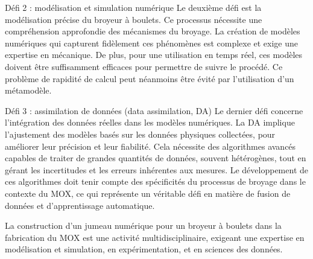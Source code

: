 Défi 2 : modélisation et simulation numérique
Le deuxième défi est la modélisation précise du broyeur à boulets. Ce processus nécessite une compréhension approfondie des mécanismes du broyage. La création de modèles numériques qui capturent fidèlement ces phénomènes est complexe et exige une expertise en mécanique. De plus, pour une utilisation en temps réel, ces modèles doivent être suffisamment efficaces pour permettre de suivre le procédé. Ce problème de rapidité de calcul peut néanmoins être évité par l'utilisation d'un métamodèle.

Défi 3 : assimilation de données (data assimilation, DA)
Le dernier défi concerne l'intégration des données réelles dans les modèles numériques. La DA implique l'ajustement des modèles basés sur les données physiques collectées, pour améliorer leur précision et leur fiabilité. Cela nécessite des algorithmes avancés capables de traiter de grandes quantités de données, souvent hétérogènes, tout en gérant les incertitudes et les erreurs inhérentes aux mesures. Le développement de ces algorithmes doit tenir compte des spécificités du processus de broyage dans le contexte du MOX, ce qui représente un véritable défi en matière de fusion de données et d'apprentissage automatique.

La construction d'un jumeau numérique pour un broyeur à boulets dans la fabrication du MOX est une activité multidisciplinaire, exigeant une expertise en modélisation et simulation, en expérimentation, et en sciences des données.